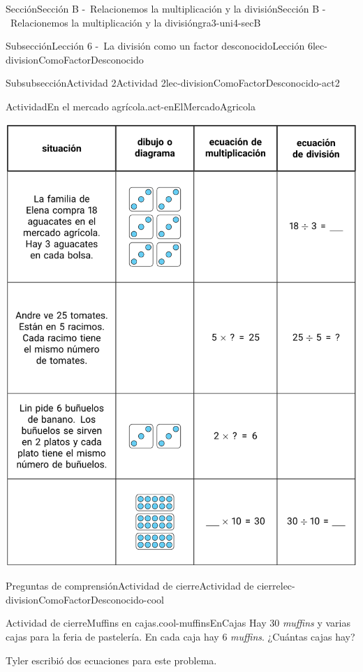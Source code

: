 \documentclass[twoside,10pt,]{article}
\begin{document}
\begin{sectionptx}{Sección}{Sección B -~Relacionemos la multiplicación y la división}{}{Sección B -~Relacionemos la multiplicación y la división}{}{}{gra3-uni4-secB}
\begin{subsectionptx}{Subsección}{Lección 6 -~La división como un factor desconocido}{}{Lección 6}{}{}{lec-divisionComoFactorDesconocido}
\begin{subsubsectionptx}{Subsubsección}{Actividad 2}{}{Actividad 2}{}{}{lec-divisionComoFactorDesconocido-act2}
\begin{activity}{Actividad}{En el mercado agrícola.}{act-enElMercadoAgricola}
\begin{image}{0}{1}{0}{}%
\includegraphics[width=\linewidth]{external/tikz-source/enElMercadoAgricola-tab.pdf}
\end{image}%
\end{activity}%
\end{subsubsectionptx}
%
%
\typeout{************************************************}
\typeout{************************************************}
%
\begin{reading-questions-subsubsection}{Preguntas de comprensión}{Actividad de cierre}{}{Actividad de cierre}{}{}{lec-divisionComoFactorDesconocido-cool}
\begin{project}{Actividad de cierre}{Muffins en cajas.}{cool-muffinsEnCajas}%
Hay 30 \emph{muffins} y varias cajas para la feria de pastelería. En cada caja hay 6 \emph{muffins}. ¿Cuántas cajas hay?%
\begin{sidebyside}{2}{0.05}{0.05}{0.1}%
\begin{sbspanel}{0.4}%
Tyler escribió dos ecuaciones para este problema.%

\end{sbspanel}
\end{sidebyside}
\end{project}
\end{reading-questions-subsubsection}
\end{subsectionptx}
\end{sectionptx}
\end{document}

